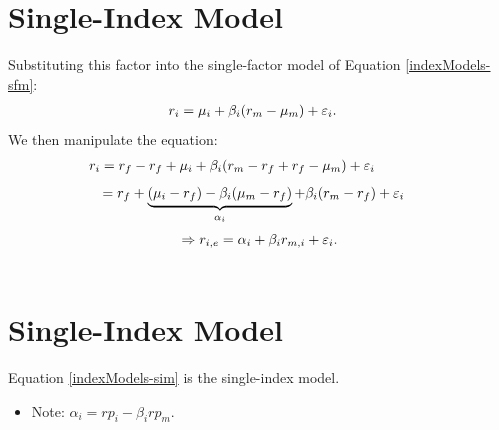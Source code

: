 \documentclass[letterpaper,10pt,english]{sphinxmanual}
\begin{document}
\section{Single-Index Model}
\label{indexModels:single-index-model}
Substituting this factor into the single-factor model of
Equation \eqref{indexModels-sfm}:
\begin{gather}
\begin{split}r_i & = \mu_i + \beta_i (r_m - \mu_m) + \varepsilon_i.\end{split}\notag
\end{gather}
We then manipulate the equation:
\begin{gather}
\begin{split}r_i & = r_f - r_f + \mu_i + \beta_i(r_m - r_f + r_f - \mu_m) +
\varepsilon_i \qquad \quad\end{split}\notag
\end{gather}\begin{gather}
\begin{split}& = r_f + \underbrace{(\mu_i - r_f) - \beta_i (\mu_m -
r_f)}_{\alpha_i} + \beta_i (r_m - r_f) + \varepsilon_i \,\end{split}\notag
\end{gather}\label{indexModels:equation-sim}\begin{gather}
\begin{split}\Rightarrow r_{i,e} = \alpha_i + \beta_i r_{m,i} + \varepsilon_i.\end{split}\label{indexModels-sim}\\\begin{split}\end{split}\notag
\end{gather}

\section{Single-Index Model}
\label{indexModels:id5}
Equation \eqref{indexModels-sim} is the single-index model.
\begin{itemize}
\item {} 
Note: $\alpha_i = rp_i - \beta_i rp_m$.

\end{itemize}
\end{document}

